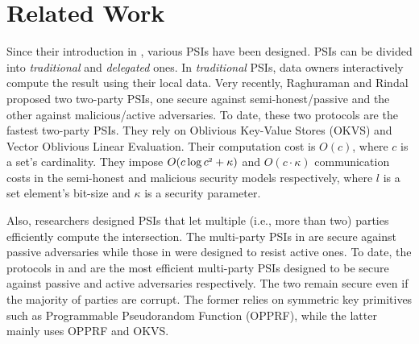 
\vs


\section{Related Work}\label{sec::related-work}


Since their introduction in \cite{DBLP:conf/eurocrypt/FreedmanNP04}, various PSIs have been designed. PSIs can be divided into \textit{traditional} and \textit{delegated} ones.   
%
In \textit{traditional} PSIs, data owners interactively compute the result using their local data. 
%
Very recently, Raghuraman and Rindal \cite{RaghuramanR22} proposed two two-party PSIs, one secure against semi-honest/passive and the other against malicious/active adversaries. To date, these two protocols are the fastest two-party PSIs. They rely on  Oblivious Key-Value Stores (OKVS)  and Vector Oblivious Linear Evaluation. Their  computation cost is $O(c)$, where $c$ is a set's cardinality.  They impose $O(c\log c^{\scriptscriptstyle 2}+\kappa)$ and $O(c\cdot \kappa)$ communication costs in the semi-honest and malicious security models respectively, where $l$ is a set element's bit-size and  $\kappa$ is a security parameter.  

Also, researchers designed PSIs that let multiple (i.e., more than two) parties efficiently compute the intersection. The multi-party PSIs in  \cite{DBLP:conf/scn/InbarOP18,DBLP:conf/ccs/KolesnikovMPRT17} are secure against passive adversaries while those in \cite{Ben-EfraimNOP21,GhoshN19,ZhangLLJL19,DBLP:conf/ccs/KolesnikovMPRT17,NevoTY21} were designed to resist active ones.  To date, the  protocols  in   \cite{DBLP:conf/ccs/KolesnikovMPRT17} and  \cite{NevoTY21} are the most  efficient multi-party PSIs  designed to be  secure against passive and active  adversaries respectively. The two remain secure even if the majority of parties are corrupt.  
%
%
The former relies on symmetric key primitives such as  Programmable Pseudorandom Function (OPPRF), while the latter mainly uses OPPRF and OKVS. 

